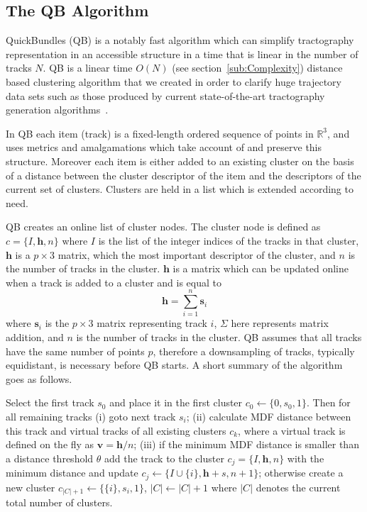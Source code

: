 \documentclass[preprint,authoryear,a4paper,10pt,onecolumn]{elsarticle}
\begin{document}
\subsection{The QB Algorithm}

QuickBundles (QB) is a notably fast algorithm which can simplify
tractography representation in an accessible structure in a time that is
linear in the number of tracks $N$. QB is a linear time $O(N)$ (see
section~\ref{sub:Complexity}) distance based clustering algorithm that
we created in order to clarify huge trajectory data sets such as those
produced by current state-of-the-art tractography generation algorithms~\citep{Parker2003,WWS+08}. 

In QB each item (track) is a fixed-length ordered sequence of points in
$\mathbb{R}^{3}$, and uses metrics and amalgamations which take account
of and preserve this structure.  Moreover each item is either added to
an existing cluster on the basis of a distance between the cluster
descriptor of the item and the descriptors of the current set of
clusters. Clusters are held in a list which is extended according to
need.

QB creates an online list of cluster nodes. The cluster node is defined
as $c=\{I,\mathbf{h},n\}$ where $I$ is the list of the integer indices
of the tracks in that cluster, $\mathbf{h}$ is a $p\times3$ matrix,
which the most important descriptor of the cluster, and $n$ is the
number of tracks in the cluster. $\mathbf{h}$ is a matrix which can be
updated online when a track is added to a cluster and is equal to
\begin{equation}
  \mathbf{h}=\sum_{i=1}^{n}\mathbf{s}_{i}
\end{equation} 
where $\mathbf{s}_{i}$ is the $p\times3$ matrix representing track $i$,
$\Sigma$ here represents matrix addition, and $n$ is the number of
tracks in the cluster. QB assumes that all tracks have the same number
of points $p$, therefore a downsampling of tracks, typically
equidistant, is necessary before QB starts. A short summary of the
algorithm goes as follows.

Select the first track $s_{0}$ and place it in the first cluster
$c_{0}\leftarrow\{0,s_{0},1\}$. Then for all remaining tracks (i) goto
next track $s_{i}$; (ii) calculate MDF distance between this track and
virtual tracks of all existing clusters $c_{k}$, where a virtual track
is defined on the fly as $\mathbf{v}=\mathbf{h}/n$; (iii) if the minimum
MDF distance is smaller than a distance threshold
$\theta$ add the track to the cluster
$c_{j}=\{I,\mathbf{h},n\}$ with the minimum distance and update
$c_{j}\leftarrow\{I\cup\{i\},\mathbf{h}+s,n+1\}$; otherwise create a new
cluster $c_{|C|+1}\leftarrow\{\{i\},s_{i},1\}$, $|C|\leftarrow|C|+1$ where
$|C|$ denotes the current total number of clusters. 
\end{document}
